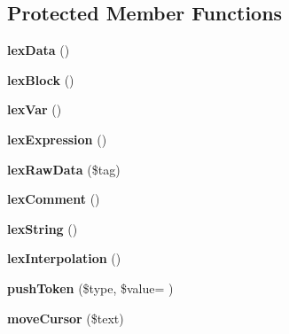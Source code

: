 \subsection*{Protected Member Functions}
\begin{DoxyCompactItemize}
\item 
{\bfseries lex\+Data} ()\hypertarget{classTwig__Lexer_ac1c919ab80c7e1befca25586e93e9e04}{}\label{classTwig__Lexer_ac1c919ab80c7e1befca25586e93e9e04}

\item 
{\bfseries lex\+Block} ()\hypertarget{classTwig__Lexer_ae5188dcc5bed054d064b9be1f3d15113}{}\label{classTwig__Lexer_ae5188dcc5bed054d064b9be1f3d15113}

\item 
{\bfseries lex\+Var} ()\hypertarget{classTwig__Lexer_af07703b89876174efe925565a60856e2}{}\label{classTwig__Lexer_af07703b89876174efe925565a60856e2}

\item 
{\bfseries lex\+Expression} ()\hypertarget{classTwig__Lexer_ab090f7e2608811e081f2de511c36d599}{}\label{classTwig__Lexer_ab090f7e2608811e081f2de511c36d599}

\item 
{\bfseries lex\+Raw\+Data} (\$tag)\hypertarget{classTwig__Lexer_a1c3e18a478ada78ba425ed7395ec2f65}{}\label{classTwig__Lexer_a1c3e18a478ada78ba425ed7395ec2f65}

\item 
{\bfseries lex\+Comment} ()\hypertarget{classTwig__Lexer_a81826aa8f559ce89ecc4e502cfb26262}{}\label{classTwig__Lexer_a81826aa8f559ce89ecc4e502cfb26262}

\item 
{\bfseries lex\+String} ()\hypertarget{classTwig__Lexer_ad4183ec00d341cbad43df44153071504}{}\label{classTwig__Lexer_ad4183ec00d341cbad43df44153071504}

\item 
{\bfseries lex\+Interpolation} ()\hypertarget{classTwig__Lexer_a4806399e3eea73ccd586ab477ce84fbe}{}\label{classTwig__Lexer_a4806399e3eea73ccd586ab477ce84fbe}

\item 
{\bfseries push\+Token} (\$type, \$value= \textquotesingle{}\textquotesingle{})\hypertarget{classTwig__Lexer_a21d75667bfff284db746cdc74d56d977}{}\label{classTwig__Lexer_a21d75667bfff284db746cdc74d56d977}

\item 
{\bfseries move\+Cursor} (\$text)\hypertarget{classTwig__Lexer_a9da57af6ed37896367949273606961c1}{}\label{classTwig__Lexer_a9da57af6ed37896367949273606961c1}


\end{DoxyCompactItemize}
